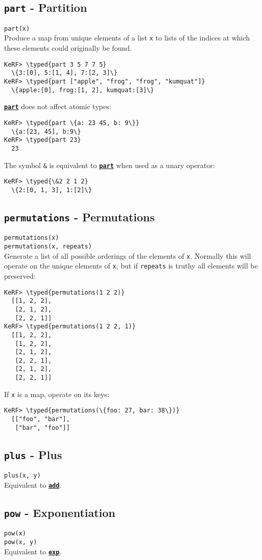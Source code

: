 \documentclass{article}
\newcommand{\typed}[1]{\textcolor{TealBlue}{#1}}
\newcommand{\primdefu}[3]{\subsection{\texttt{#1} - #2}\label{prim:#3}}
\newcommand{\primu}[2]{\hyperref[prim:#2]{\textbf{\texttt{#1}}}}
\newcommand{\primdef}[2]{\primdefu{#1}{#2}{#1}}
\newcommand{\prim}[1]{\primu{#1}{#1}}
\begin{document}
\pagebreak
\primdef{part}{Partition}
\texttt{part(x)}\\

Produce a map from unique elements of a list \texttt{x} to lists of the indices at which these elements could originally be found.
\begin{Verbatim}
KeRF> \typed{part 3 5 7 7 5}
  \{3:[0], 5:[1, 4], 7:[2, 3]\}
KeRF> \typed{part ["apple", "frog", "frog", "kumquat"]}
  \{apple:[0], frog:[1, 2], kumquat:[3]\}
\end{Verbatim}

\prim{part} does not affect atomic types:
\begin{Verbatim}
KeRF> \typed{part \{a: 23 45, b: 9\}}
  \{a:[23, 45], b:9\}
KeRF> \typed{part 23}
  23
\end{Verbatim}

The symbol \texttt{\&} is equivalent to \prim{part} when used as a unary operator:
\begin{Verbatim}
KeRF> \typed{\&2 2 1 2}
  \{2:[0, 1, 3], 1:[2]\}
\end{Verbatim}

\primdef{permutations}{Permutations}
\texttt{permutations(x)}\\
\texttt{permutations(x, repeats)}\\

Generate a list of all possible orderings of the elements of \texttt{x}. Normally this will operate on the unique elements of \texttt{x}, but if \texttt{repeats} is truthy all elements will be preserved:
\begin{Verbatim}
KeRF> \typed{permutations(1 2 2)}
  [[1, 2, 2], 
   [2, 1, 2], 
   [2, 2, 1]]
KeRF> \typed{permutations(1 2 2, 1)}
  [[1, 2, 2], 
   [1, 2, 2], 
   [2, 1, 2], 
   [2, 2, 1], 
   [2, 1, 2], 
   [2, 2, 1]]
\end{Verbatim}

If \texttt{x} is a map, operate on its keys:
\begin{Verbatim}
KeRF> \typed{permutations(\{foo: 27, bar: 38\})}
  [["foo", "bar"], 
   ["bar", "foo"]]
\end{Verbatim}

\primdef{plus}{Plus}
\texttt{plus(x, y)}\\

Equivalent to \prim{add}.

\primdef{pow}{Exponentiation}
\texttt{pow(x)}\\
\texttt{pow(x, y)}\\

Equivalent to \prim{exp}.
\end{document}
